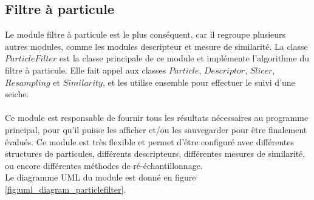 



\subsection{Filtre à particule}
Le module filtre à particule est le plus conséquent, car il regroupe plusieurs autres modules, comme les modules descripteur et mesure de similarité. La classe $ParticleFilter$ est la classe principale de ce module et implémente l'algorithme du filtre à particule. Elle fait appel aux classes $Particle$, $Descriptor$, $Slicer$, $Resampling$ et $Similarity$, et les utilise ensemble pour effectuer le suivi d'une seiche.\\
\\
Ce module est responsable de fournir tous les résultats nécessaires au programme principal, pour qu'il puisse les afficher et/ou les sauvegarder pour être finalement évalués. Ce module est très flexible et permet d'être configuré avec différentes structures de particules, différents descripteurs, différentes mesures de similarité, ou encore différentes méthodes de ré-échantillonnage.\\
Le diagramme UML du module est donné en figure \ref{fig:uml_diagram_particlefilter}.






